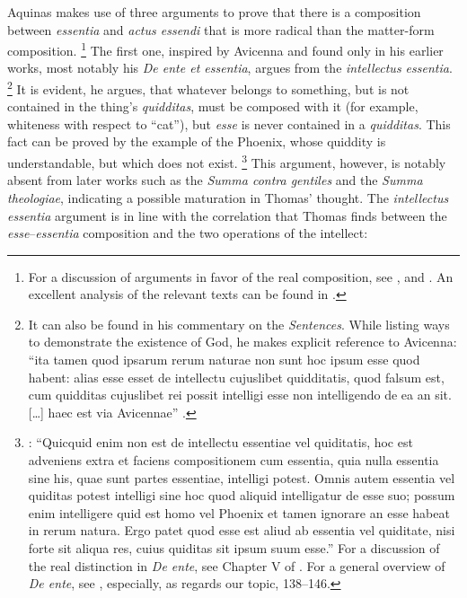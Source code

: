 Aquinas makes use of three arguments to prove that there is a composition between \emph{essentia} and \emph{actus essendi} that is more radical than the matter-form composition.%
%
\footnote{For a discussion of arguments in favor of the real composition, see \cite[211-215]{fabro:nozione}, and \cite[133--161]{wippel:metaphysical_themes_1}. An excellent analysis of the relevant texts can be found in \cite[94-107]{definance:etre-et-agir}.} The first one, inspired by Avicenna and found only in his earlier works, most notably  his \emph{De ente et essentia}, argues from the \emph{intellectus essentia}.%
%
\footnote{It can also be found in his commentary on the \emph{Sentences}. While listing ways to demonstrate the existence of God, he makes explicit reference to Avicenna: ``ita tamen quod ipsarum rerum naturae non sunt hoc ipsum esse quod habent: alias esse esset de intellectu cujuslibet quidditatis, quod falsum est, cum quidditas cujuslibet rei possit intelligi esse non intelligendo de ea an sit. [\ldots] haec est via Avicennae'' \parencite[lib.~2, d.~1, q.~1, a.~1, co.]{st:sent}.}
%
It is evident, he argues, that whatever belongs to something, but is not contained in the thing's \emph{quidditas}, must be composed with it (for example, whiteness with respect to ``cat''), but \emph{esse} is never contained in a \emph{quidditas}. This fact can be proved by the example of the Phoenix, whose quiddity is understandable, but which does not exist.%
%
\footnote{\Cite[cap.~3]{st:deente}: ``Quicquid enim non est de intellectu essentiae vel quiditatis, hoc est adveniens extra et faciens compositionem cum essentia, quia nulla essentia sine his, quae sunt partes essentiae, intelligi potest. Omnis autem essentia vel quiditas potest intelligi sine hoc quod aliquid intelligatur de esse suo; possum enim intelligere quid est homo vel Phoenix et tamen ignorare an esse habeat in rerum natura. Ergo patet quod esse est aliud ab essentia vel quiditate, nisi forte sit aliqua res, cuius quiditas sit ipsum suum esse.'' For a discussion of the real distinction in \emph{De ente}, see Chapter V of \cite[107--132]{wippel:metaphysical_themes_1}.
For a general overview of \emph{De ente}, see \cite{giorgini:ente}, especially, as regards our topic, 138--146.}
%
This argument, however, is notably absent from later works such as the \emph{Summa contra gentiles} and the \emph{Summa theologiae}, indicating a possible maturation in Thomas' thought. The \emph{intellectus essentia} argument is in line with the correlation that Thomas finds between the \emph{esse}--\emph{essentia} composition and the two operations of the intellect:
